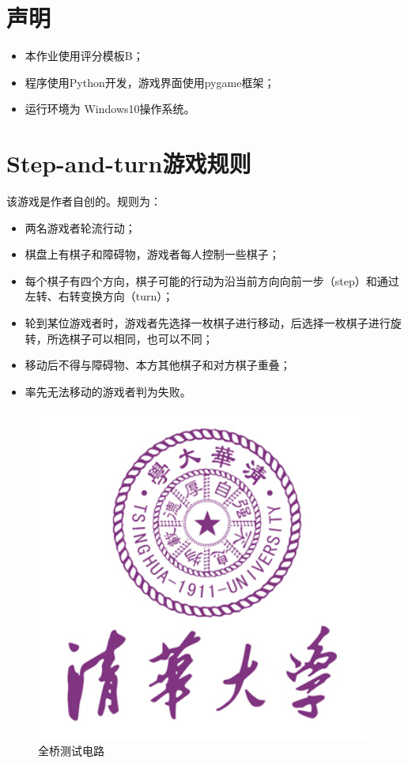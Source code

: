 \tableofcontents
\clearpage


\section{声明}
\begin{itemize}
\item 本作业使用评分模板B；
\item 程序使用{\ttfamily Python}开发，游戏界面使用{\ttfamily pygame}框架；
\item 运行环境为 {\ttfamily Windows10}操作系统。
\end{itemize}

\section{Step-and-turn游戏规则}
该游戏是作者自创的。规则为：
\begin{itemize}
	\item 两名游戏者轮流行动；
	\item 棋盘上有棋子和障碍物，游戏者每人控制一些棋子；
	\item 每个棋子有四个方向，棋子可能的行动为沿当前方向向前一步（step）和通过左转、右转变换方向（turn）；
	\item 轮到某位游戏者时，游戏者先选择一枚棋子进行移动，后选择一枚棋子进行旋转，所选棋子可以相同，也可以不同；
	\item 移动后不得与障碍物、本方其他棋子和对方棋子重叠；
	\item 率先无法移动的游戏者判为失败。
\end{itemize}

\begin{figure}[htbp]
\centering
\includegraphics[width=11cm]{logo.jpg}
\caption{全桥测试电路}
\label{fig:fullarm}
\end{figure}


